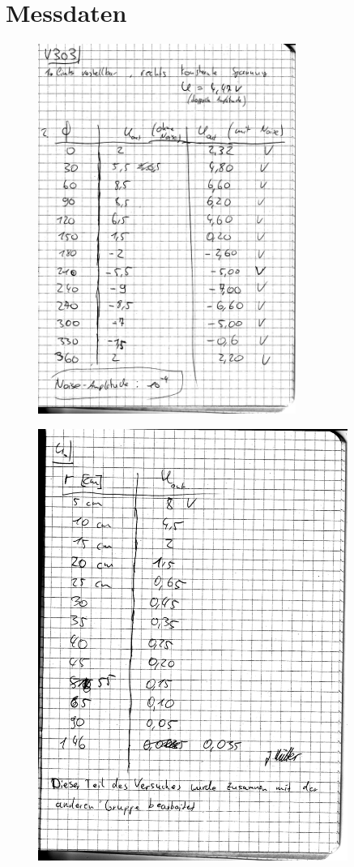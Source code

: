 \appendix

\clearpage
\section{Messdaten}

\begin{figure}
    \centering
    \includegraphics[width=0.75\textwidth]{assets/messdaten1.pdf}
\end{figure}
\begin{figure}
    \centering
    \includegraphics[width=0.9\textwidth]{assets/messdaten2.pdf}
\end{figure}